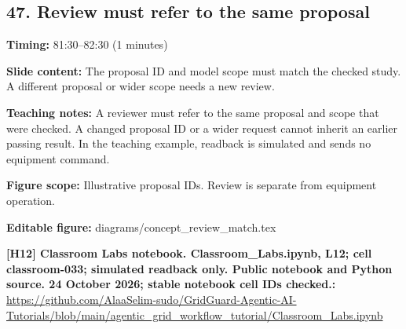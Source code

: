 \documentclass[10pt,letterpaper]{article}
\begin{document}
\subsection*{47. Review must refer to the same proposal}
\textbf{Timing:} 81:30--82:30 (1 minutes)\par
\textbf{Slide content:} The proposal ID and model scope must match the checked study.
A different proposal or wider scope needs a new review.\par
\textbf{Teaching notes:} A reviewer must refer to the same proposal and scope that were checked. A changed proposal ID or a wider request cannot inherit an earlier passing result. In the teaching example, readback is simulated and sends no equipment command.\par
\textbf{Figure scope:} Illustrative proposal IDs. Review is separate from equipment operation.\par
\textbf{Editable figure:} diagrams/concept\_review\_match.tex\par
\textbf{[H12] Classroom Labs notebook. Classroom\_Labs.ipynb, L12; cell classroom-033; simulated readback only. Public notebook and Python source. 24 October 2026; stable notebook cell IDs checked.:} \href{https://github.com/AlaaSelim-sudo/GridGuard-Agentic-AI-Tutorials/blob/main/agentic_grid_workflow_tutorial/Classroom_Labs.ipynb}{\small\ttfamily https:/\allowbreak{}/\allowbreak{}github.\allowbreak{}com/\allowbreak{}AlaaSelim-\allowbreak{}sudo/\allowbreak{}GridGuard-\allowbreak{}Agentic-\allowbreak{}AI-\allowbreak{}Tutorials/\allowbreak{}blob/\allowbreak{}main/\allowbreak{}agentic\_\allowbreak{}grid\_\allowbreak{}workflow\_\allowbreak{}tutorial/\allowbreak{}Classroom\_\allowbreak{}Labs.\allowbreak{}ipynb}\par
\par\medskip
\end{document}
